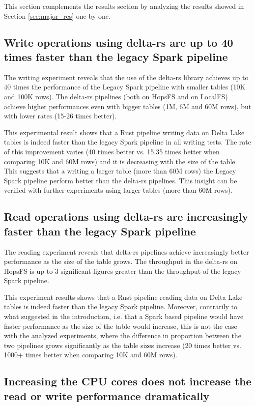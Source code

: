 This section complements the results section by analyzing the results showed in Section \ref{sec:major_res} one by one.

\subsection{Write operations using delta-rs are up to 40 times faster than the legacy Spark pipeline}
The writing experiment reveals that the use of the delta-rs library achieves up to 40 times the performance of the Legacy Spark pipeline with smaller tables (10K and 100K rows). The delta-rs pipelines (both on \gls{HopsFS} and on \gls{LocalFS}) achieve higher performances even with bigger tables (1M, 6M and 60M rows), but with lower rates (15-26 times better). 

This experimental result shows that a Rust pipeline writing data on Delta Lake tables is indeed faster than the legacy Spark pipeline in all writing tests. The rate of this improvement varies (40 times better vs. 15.35 times better when comparing 10K and 60M rows) and it is decreasing with the size of the table. This suggests that a writing a larger table (more than 60M rows) the Legacy Spark pipeline perform better than the delta-rs pipelines. This insight can be verified with further experiments using larger tables (more than 60M rows).

\subsection{Read operations using delta-rs are increasingly faster than the legacy Spark pipeline}

The reading experiment reveals that delta-rs pipelines achieve increasingly better performance as the size of the table grows. The throughput in the delta-rs on \gls{HopsFS} is up to 3 significant figures greater than the throughput of the legacy Spark pipeline.

This experiment results shows that a Rust pipeline reading data on Delta Lake tables is indeed faster than the legacy Spark pipeline. Moreover, contrarily to what suggested in the introduction, i.e. that a Spark based pipeline would have faster performance as the size of the table would increase, this is not the case with the analyzed experiments, where the difference in proportion between the two pipelines grows significantly as the table sizes increase (20 times better vs. 1000+ times better when comparing 10K and 60M rows).

\subsection{Increasing the CPU cores does not increase the read or write performance dramatically}

